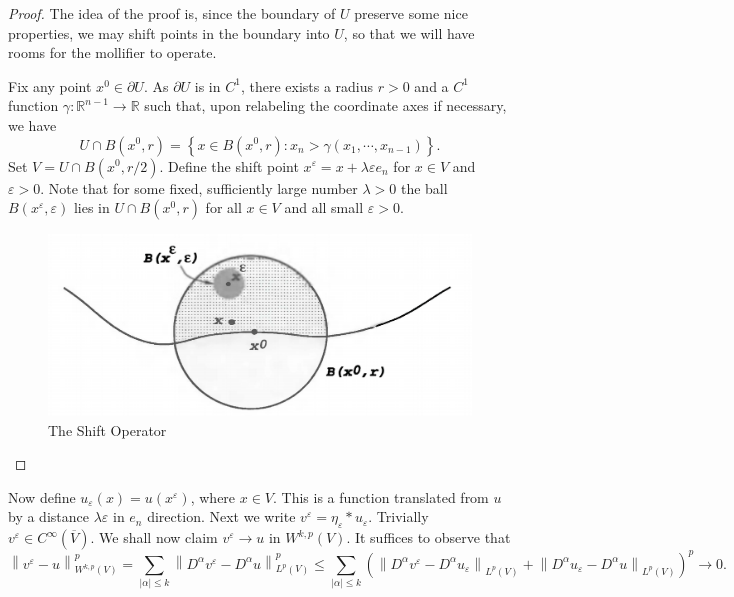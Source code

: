 \begin{proof}
The idea of the proof is, since the boundary of $U$ preserve some nice properties, we may shift points in the boundary into $U$, so that we will have rooms for the mollifier to operate.\par
Fix any point $x^0\in\partial U$. As $\partial U$ is in $C^1$, there exists a radius $r>0$ and a $C^1$ function $\gamma:\mathbb{R}^{n-1}\to\mathbb{R}$ such that, upon relabeling the coordinate axes if necessary, we have 
$$
U\cap B\left( x^0,r \right) =\left\{ x\in B\left( x^0,r \right) :x_n>\gamma \left( x_1,\cdots ,x_{n-1} \right) \right\} .
$$
Set $V=U\cap B(x^0,r/2)$. Define the shift point $x^\varepsilon=x+\lambda\varepsilon e_n$ for $x\in V$ and $\varepsilon>0$. Note that for some fixed, sufficiently large number $\lambda>0$ the ball $B(x^\varepsilon,\varepsilon)$ lies in $U\cap B(x^0,r)$ for all $x\in V$ and all small $\varepsilon>0$.\par
\begin{figure}[htbp]
    \center
    \includegraphics[scale=0.29]{Image/shift operator.png}
    \caption{The Shift Operator}
\end{figure}
\end{proof}
Now define $u_\varepsilon(x)=u(x^\varepsilon)$, where $x\in V$. This is a function translated from $u$ by a distance $\lambda\varepsilon$ in $e_n$ direction. Next we write $v^\varepsilon=\eta_\varepsilon*u_\varepsilon$. Trivially $v^\varepsilon\in C^\infty(\overline{V})$. We shall now claim $v^\varepsilon\to u$ in $W^{k,p}(V)$. It suffices to observe that 
$$
\left\| v^{\varepsilon}-u \right\| _{W^{k,p}\left( V \right)}^{p}=\sum_{\left| \alpha \right|\le k}{\left\| D^{\alpha}v^{\varepsilon}-D^{\alpha}u \right\| _{L^p\left( V \right)}^{p}}\le \sum_{\left| \alpha \right|\le k}{\left( \left\| D^{\alpha}v^{\varepsilon}-D^{\alpha}u_{\varepsilon} \right\| _{L^p\left( V \right)}+\left\| D^{\alpha}u_{\varepsilon}-D^{\alpha}u \right\| _{L^p\left( V \right)} \right) ^p}\rightarrow 0.
$$
